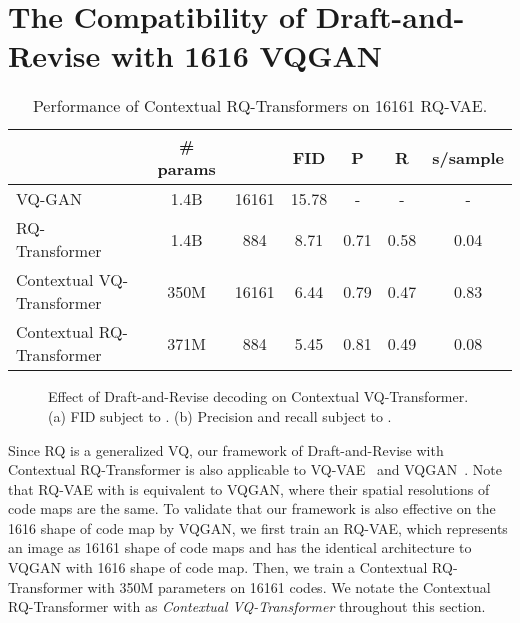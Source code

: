 \documentclass{article}
\begin{document}
\section{The Compatibility of Draft-and-Revise with 1616 VQGAN}


\begin{table} \small
\centering\caption{Performance of Contextual RQ-Transformers on 16161 RQ-VAE.}
\label{tab:rq_16x16}
\begin{tabular}{l|c|c|cccc}
\toprule
 & \# params &  & FID & P & R & s/sample \\ \hline
VQ-GAN~\cite{VQGAN} & 1.4B & 16161 & 15.78 & - & - & - \\ RQ-Transformer~\cite{RQVAE} & 1.4B & 884 & 8.71 & 0.71 & 0.58 & 0.04 \\ \hline

Contextual VQ-Transformer & 350M & 16161 & 6.44 & 0.79 & 0.47 & 0.83 \\ \hline
Contextual RQ-Transformer & 371M & 884 & 5.45 & 0.81 & 0.49 & 0.08 \\
\bottomrule
\end{tabular}
\end{table} 

\begin{figure}
\centering
{}
\caption{Effect of Draft-and-Revise decoding on Contextual VQ-Transformer. (a) FID subject to . (b) Precision and recall subject to .}
\label{fig:rq_16x16}
\end{figure}

Since RQ is a generalized VQ, our framework of Draft-and-Revise with Contextual RQ-Transformer is also applicable to VQ-VAE~\cite{VQVAE} and VQGAN~\cite{VQGAN}.
Note that RQ-VAE with  is equivalent to VQGAN, where their spatial resolutions of code maps are the same.
To validate that our framework is also effective on the 1616 shape of code map by VQGAN, we first train an RQ-VAE, which represents an image as 16161 shape of code maps and has the identical architecture to VQGAN with 1616 shape of code map.
Then, we train a Contextual RQ-Transformer with 350M parameters on 16161 codes. 
We notate the Contextual RQ-Transformer with  as \emph{Contextual VQ-Transformer} throughout this section.
\end{document}
